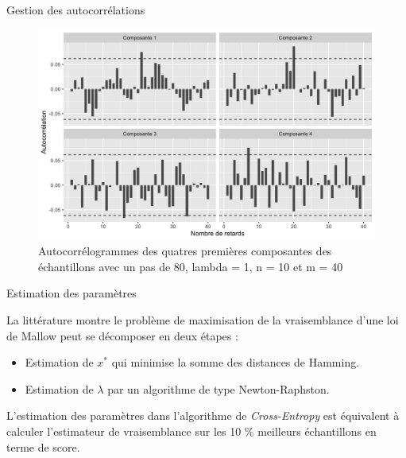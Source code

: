 \documentclass[10pt,xcolor=table,color={dvipsnames,usenames},ignorenonframetext,usepdftitle=false,french]{beamer}
\begin{document}
\begin{frame}{Gestion des autocorrélations}
\protect\hypertarget{gestion-des-autocorruxe9lations-2}{}

\begin{figure}
\includegraphics[width=33.33in]{img/acfn10m40corr} \caption{Autocorrélogrammes des quatres premières composantes des échantillons avec un pas de 80, lambda = 1, n = 10 et m = 40}\label{fig:acfn10m40corr}
\end{figure}

\end{frame}

\begin{frame}{Estimation des paramètres}
\protect\hypertarget{estimation-des-paramuxe8tres}{}

La littérature montre le problème de maximisation de la vraisemblance
d'une loi de Mallow peut se décomposer en deux étapes :

\begin{itemize}
\item Estimation de $x^*$ qui minimise la somme des distances de Hamming.
\item Estimation de $\lambda$ par un algorithme de type Newton-Raphston.
\end{itemize}

L'estimation des paramètres dans l'algorithme de \emph{Cross-Entropy}
est équivalent à calculer l'estimateur de vraisemblance sur les 10 \%
meilleurs échantillons en terme de score.

\end{frame}
\end{document}
